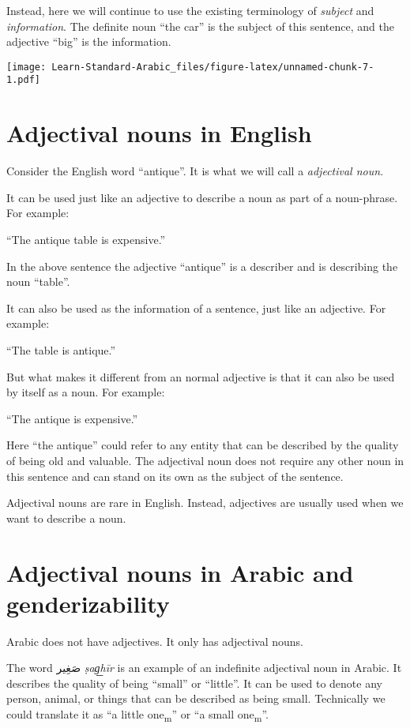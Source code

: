 \documentclass[
  10pt,
]{book}
\begin{document}
Instead, here we will continue to use the existing terminology of \emph{subject} and \emph{information}. The definite noun \enquote{the car} is the subject of this sentence, and the adjective \enquote{big} is the information.

\texttt{[image: Learn-Standard-Arabic\_files/figure-latex/unnamed-chunk-7-1.pdf]}

\section{Adjectival nouns in English}\label{adjectival-nouns-in-english}

Consider the English word \enquote{antique}. It is what we will call a \emph{adjectival noun}.

It can be used just like an adjective to describe a noun as part of a noun-phrase. For example:

\enquote{The antique table is expensive.}

In the above sentence the adjective \enquote{antique} is a describer and is describing the noun \enquote{table}.

It can also be used as the information of a sentence, just like an adjective. For example:

\enquote{The table is antique.}

But what makes it different from an normal adjective is that it can also be used by itself as a noun. For example:

\enquote{The antique is expensive.}

Here \enquote{the antique} could refer to any entity that can be described by the quality of being old and valuable. The adjectival noun does not require any other noun in this sentence and can stand on its own as the subject of the sentence.

Adjectival nouns are rare in English. Instead, adjectives are usually used when we want to describe a noun.

\section{Adjectival nouns in Arabic and genderizability}\label{adjectival-nouns-in-arabic-and-genderizability}

Arabic does not have adjectives. It only has adjectival nouns.

The word \foreignlanguage{arabic}{صَغِير} \emph{ṣag͟hīr} is an example of an indefinite adjectival noun in Arabic. It describes the quality of being \enquote{small} or \enquote{little}. It can be used to denote any person, animal, or things that can be described as being small. Technically we could translate it as \enquote{a little one\textsubscript{m}} or \enquote{a small one\textsubscript{m}}.
\end{document}
